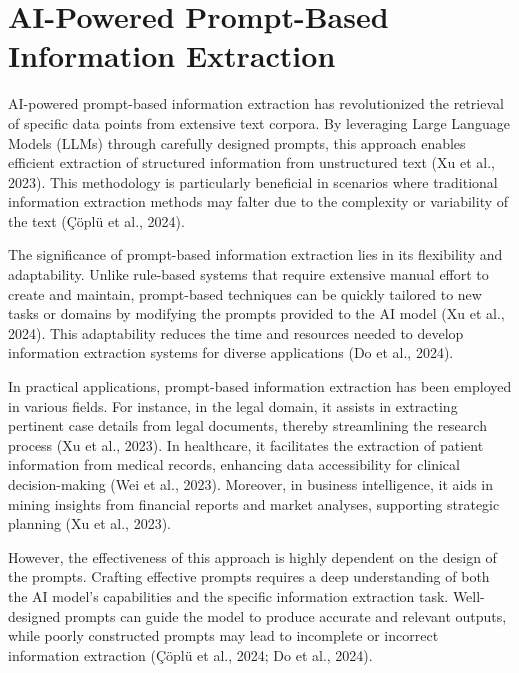 
\section{AI-Powered Prompt-Based Information Extraction}

\noindent AI-powered prompt-based information extraction has revolutionized the retrieval of specific data points from extensive text corpora. By leveraging Large Language Models (LLMs) through carefully designed prompts, this approach enables efficient extraction of structured information from unstructured text (Xu et al., 2023). This methodology is particularly beneficial in scenarios where traditional information extraction methods may falter due to the complexity or variability of the text (Çöplü et al., 2024).

The significance of prompt-based information extraction lies in its flexibility and adaptability. Unlike rule-based systems that require extensive manual effort to create and maintain, prompt-based techniques can be quickly tailored to new tasks or domains by modifying the prompts provided to the AI model (Xu et al., 2024). This adaptability reduces the time and resources needed to develop information extraction systems for diverse applications (Do et al., 2024).

In practical applications, prompt-based information extraction has been employed in various fields. For instance, in the legal domain, it assists in extracting pertinent case details from legal documents, thereby streamlining the research process (Xu et al., 2023). In healthcare, it facilitates the extraction of patient information from medical records, enhancing data accessibility for clinical decision-making (Wei et al., 2023). Moreover, in business intelligence, it aids in mining insights from financial reports and market analyses, supporting strategic planning (Xu et al., 2023).

However, the effectiveness of this approach is highly dependent on the design of the prompts. Crafting effective prompts requires a deep understanding of both the AI model's capabilities and the specific information extraction task. Well-designed prompts can guide the model to produce accurate and relevant outputs, while poorly constructed prompts may lead to incomplete or incorrect information extraction (Çöplü et al., 2024; Do et al., 2024).



